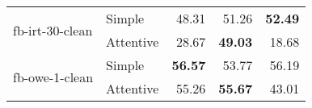 \begin{tabular}{| l | l | r | r | r |}
    \multirow{2}{*}{fb-irt-30-clean}
    & Simple    & 48.31 & 51.26 & \textbf{52.49} \\
    & Attentive & 28.67 & \textbf{49.03} & 18.68 \\ \hline
    
    \multirow{2}{*}{fb-owe-1-clean}
    & Simple    & \textbf{56.57} & 53.77 & 56.19 \\
    & Attentive & 55.26 & \textbf{55.67} & 43.01 \\ \hline
    
\end{tabular}
